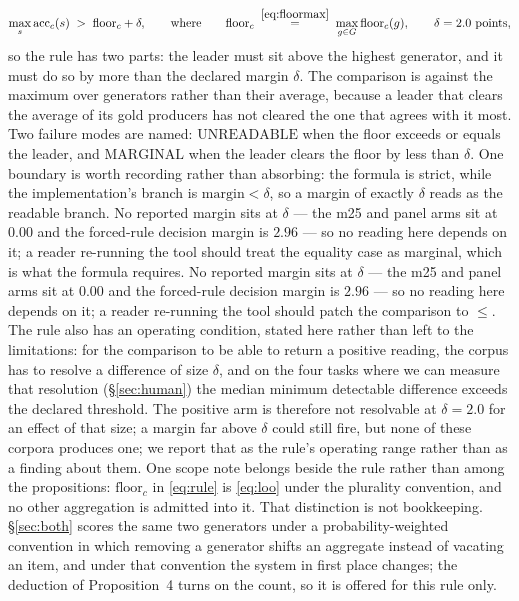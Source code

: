 \documentclass{article}
\begin{document}
\begin{equation}
\max_s \mathrm{acc}_{c}(s) \;>\; \mathrm{floor}_c + \delta,
\qquad\text{where}\qquad
\mathrm{floor}_c \;\overset{\eqref{eq:floormax}}{=}\; \max_{g \in G} \mathrm{floor}_c(g),
\qquad \delta = 2.0\ \text{points},
\label{eq:rule}
\end{equation} so the rule has two parts: the leader must sit above the highest generator, and it must do so by more than the declared margin $\delta$. The comparison is against the maximum over generators rather than their average, because a leader that clears the average of its gold producers has not cleared the one that agrees with it most. Two failure modes are named: $\mathrm{UNREADABLE}$ when the floor exceeds or equals the leader, and $\mathrm{MARGINAL}$ when the leader clears the floor by less than $\delta$. One boundary is worth recording rather than absorbing: the formula is strict, while the implementation's branch is $\mathrm{margin} < \delta$, so a margin of exactly $\delta$ reads as the readable branch. No reported margin sits at $\delta$ --- the m25 and panel arms sit at $0.00$ and the forced-rule decision margin is $2.96$ --- so no reading here depends on it; a reader re-running the tool should treat the equality case as marginal, which is what the formula requires. No reported margin sits at $\delta$ --- the m25 and panel arms sit at $0.00$ and the forced-rule decision margin is $2.96$ --- so no reading here depends on it; a reader re-running the tool should patch the comparison to $\le$. The rule also has an operating condition, stated here rather than left to the limitations: for the comparison to be able to return a positive reading, the corpus has to resolve a difference of size $\delta$, and on the four tasks where we can measure that resolution (\S\ref{sec:human}) the median minimum detectable difference exceeds the declared threshold. The positive arm is therefore not resolvable at $\delta = 2.0$ for an effect of that size; a margin far above $\delta$ could still fire, but none of these corpora produces one; we report that as the rule's operating range rather than as a finding about them. One scope note belongs beside the rule rather than among the propositions: $\mathrm{floor}_c$ in \eqref{eq:rule} is \eqref{eq:loo} under the plurality convention, and no other aggregation is admitted into it. That distinction is not bookkeeping. \S\ref{sec:both} scores the same two generators under a probability-weighted convention in which removing a generator shifts an aggregate instead of vacating an item, and under that convention the system in first place changes; the deduction of Proposition~4 turns on the count, so it is offered for this rule only.
\end{document}
